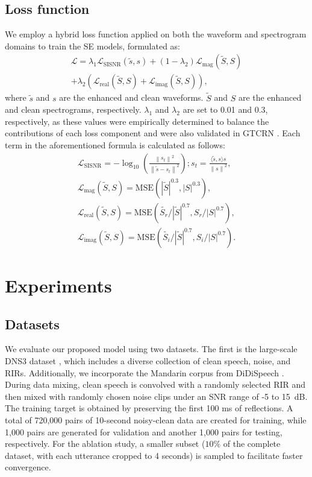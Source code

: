 \documentclass[journal]{IEEEtran}
\newcommand{\rev}[1]{#1}
\begin{document}
\subsection{Loss function}
We employ a hybrid loss function applied on both the waveform and spectrogram domains to train the SE models, formulated as:
\begin{equation}
  \begin{split}
  \mathcal{L}=\rev{\lambda_1}\mathcal{L}_{\text{SISNR}}(\tilde{s},s) + (1-\rev{\lambda_2}) \mathcal{L}_{\text{mag}}(\tilde{S},S) \\
             + \rev{\lambda_2}\left(\mathcal{L}_{\text{real}}(\tilde{S},S)+\mathcal{L}_{\text{imag}}(\tilde{S},S)\right),
  \end{split}
\end{equation}
where $\tilde{s}$ and $s$ are the enhanced and clean waveforms. $\tilde{S}$ and $S$ are the enhanced and clean spectrograms, respectively. \rev{$\lambda_1$} and \rev{$\lambda_2$} are set to 0.01 and 0.3, respectively, \rev{as these values were empirically determined to balance the contributions of each loss component and were also validated in GTCRN \cite{GTCRN}}. Each term in the aforementioned formula is calculated as follows:
\begin{gather}
  \mathcal{L}_{\text{SISNR}}=-\log_{10}\left( \frac{\left\|s_{t}\right\|^{2}}
  {\left\|\tilde{s}-s_{t}\right\|^{2}} \right);
  s_{t}=\frac{\langle \tilde{s}, s \rangle s}{\left\|s\right\|^{2}},
  \\
  \mathcal{L}_{\text{mag}}(\tilde{S},S)=\mathrm{MSE}(|\tilde{S}|^{0.3},|S|^{0.3}),
  \\
  \mathcal{L}_{\text{real}}(\tilde{S},S)=\mathrm{MSE}(\tilde{S_{r}}/|\tilde{S}|^{0.7},S_{r}/|S|^{0.7}),
  \\
  \mathcal{L}_{\text{imag}}(\tilde{S},S)=\mathrm{MSE}(\tilde{S_{i}}/|\tilde{S}|^{0.7},S_{i}/|S|^{0.7}).
\end{gather}

\section{Experiments}
\subsection{Datasets}

We evaluate our proposed model using two datasets. The first is the large-scale DNS3 dataset \cite{DNS3}, which includes a diverse collection of clean speech, noise, and RIRs. Additionally, we incorporate the Mandarin corpus from DiDiSpeech \cite{DiDiSpeech}. During data mixing, clean speech is convolved with a randomly selected RIR and then mixed with randomly chosen noise clips under an SNR range of -5 to \SI{15}{dB}. The training target is obtained by preserving the first 100 ms of reflections. A total of 720,000 pairs of 10-second noisy-clean data are created for training, while 1,000 pairs are generated for validation and another 1,000 pairs for testing, respectively. For the ablation study, a smaller subset ($10\%$ of the complete dataset, with each utterance cropped to 4 seconds) is sampled to facilitate faster convergence. 
\end{document}
